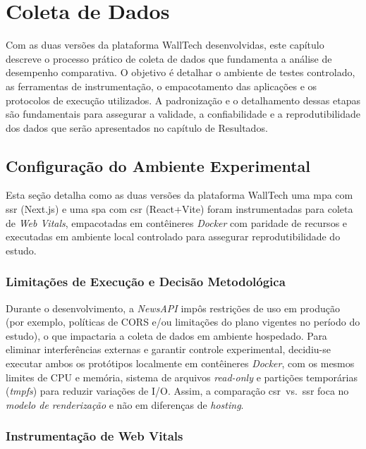 \chapter{Coleta de Dados}
\label{cap:metodologia_experimental}


Com as duas versões da plataforma WallTech desenvolvidas, este capítulo descreve o processo prático de coleta de dados que fundamenta a análise de desempenho comparativa. O objetivo é detalhar o ambiente de testes controlado, as ferramentas de instrumentação, o empacotamento das aplicações e os protocolos de execução utilizados. A padronização e o detalhamento dessas etapas são fundamentais para assegurar a validade, a confiabilidade e a reprodutibilidade dos dados que serão apresentados no capítulo de Resultados.



\section{Configuração do Ambiente Experimental}
\label{sec:ambiente-experimental}

Esta seção detalha como as duas versões da plataforma WallTech uma \acrshort{mpa} com \acrshort{ssr} (Next.js) e uma \acrshort{spa} com \acrshort{csr} (React+Vite) foram instrumentadas para coleta de \textit{Web Vitals}, empacotadas em contêineres \textit{Docker} com paridade de recursos e executadas em ambiente local controlado para assegurar reprodutibilidade do estudo.

\subsection{Limitações de Execução e Decisão Metodológica}
\label{ssec:limitacoes-execucao}

Durante o desenvolvimento, a \textit{NewsAPI} impôs restrições de uso em produção (por exemplo, políticas de CORS e/ou limitações do plano vigentes no período do estudo), o que impactaria a coleta de dados em ambiente hospedado. Para eliminar interferências externas e garantir controle experimental, decidiu-se executar ambos os protótipos localmente em contêineres \textit{Docker}, com os mesmos limites de CPU e memória, sistema de arquivos \textit{read-only} e partições temporárias (\textit{tmpfs}) para reduzir variações de I/O. Assim, a comparação \acrshort{csr}~vs.~\acrshort{ssr} foca no \textit{modelo de renderização} e não em diferenças de \textit{hosting}.

\subsection{Instrumentação de Web Vitals}
\label{ssec:instrumentacao-webvitals}

